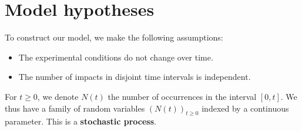 \section{Model hypotheses}%
To construct our model, we make the following assumptions:%
\begin{itemize}
    \item[i)] The experimental conditions do not change over time.
    \item[ii)] The number of impacts in disjoint time intervals is independent.
\end{itemize}%
For $t \ge 0$, we denote $N(t)$ the number of occurrences in the interval $[0, t]$.
We thus have a family of random variables $(N(t))_{t \ge 0}$ indexed by a continuous parameter. This is a \textbf{stochastic process}.%
